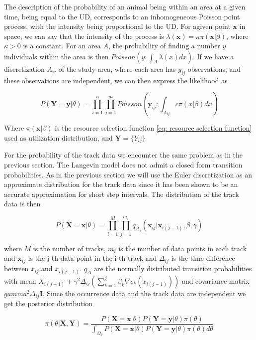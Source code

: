 The description of the probability of an animal being within an area at a given time, being equal to the UD, corresponds to an inhomogeneous Poisson point process, with the intensity being proportional to the UD. For agiven point $\textbf{x}$ in space, we can say that the intensity of the process is $\lambda(\textbf{x}) = \kappa \pi(\textbf{x}|\beta)$, where $\kappa>0$ is a constant. For an area $A$, the probability of finding a number $y$ individuals within the area is then $Poisson(y:\int_A \lambda(x)dx)$. If we have a discretization $A_{ij}$ of the study area, where each area has $y_{ij}$ observations, and these observations are independent, we can then express the likelihood as 


\begin{equation}
    P(\textbf{Y} = \textbf{y}|\theta) = \prod_{i=1}^n \prod_{j=1}^m Poisson(\textbf{y}_{ij}: \int_{A_{ij}} c\pi(x|\beta)dx)
\end{equation}

Where $ \pi(\textbf{x}|\beta) $ is the resource selection function \ref{eq: resource selection function} used as utilization distribution, and $\textbf{Y} = \{Y_{ij}\}$ 

For the probability of the track data we encounter the same problem as in the previous section. The Langevin model does not admit a closed form transition probabilities. As in the previous section we will use the Euler discretization as an approximate distribution for the track data since it has been shown to be an accurate approximation for short step intervals. The distribution of the track data is then

\begin{equation}
    P(\textbf{X} = \textbf{x}|\theta) = \prod_{i=1}^M \prod_{j=1}^{m_i} q_{\Delta_i}(\textbf{x}_{ij}|\textbf{x}_{i(j-1)}, \beta, \gamma)
\end{equation}
    
where $M$ is the number of tracks, $m_i$ is the number of data points in each track and $\textbf{x}_{ij}$ is the j-th data point in the i-th track and $\Delta_{ij}$ is the time-difference between $x_{ij}$ and $x_{i(j-1)}$. $q_{\Delta}$ are the normally distributed transition probabilities with mean $X_{i(j-1)} + \gamma^2\Delta_{ij}(\sum_{k = 1}^j \beta_k \nabla c_k(x_{i(j-1)}))$ and covariance matrix $gamma^2\Delta_{ij} \textbf{I}$. Since the occurrence data and the track data are independent we get the posterior distribution 


\begin{equation}
    \pi(\theta|\textbf{X}, \textbf{Y}) = \frac{P(\textbf{X} = \textbf{x}|\theta)P(\textbf{Y} = \textbf{y}|\theta)\pi(\theta)}{\int_{\Omega_\theta} P(\textbf{X} = \textbf{x}|\theta)P(\textbf{Y} = \textbf{y}|\theta)\pi(\theta)d\theta}
\end{equation}

